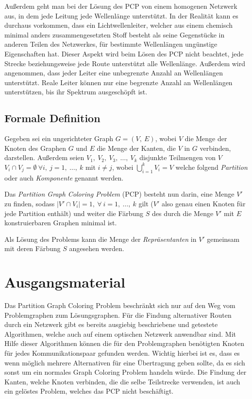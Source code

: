 Außerdem geht man bei der Lösung des PCP von einem homogenen Netzwerk aus, in dem jede Leitung jede Wellenlänge unterstützt. In der Realität kann es durchaus vorkommen, dass ein
Lichtwellenleiter, welcher aus einem chemisch minimal anders zusammengesetzten Stoff besteht als seine Gegenstücke in anderen Teilen des Netzwerkes, für bestimmte Wellenlängen
ungünstige Eigenschaften hat. Dieser Aspekt wird beim Lösen des PCP nicht beachtet, jede Strecke beziehungsweise jede Route unterstützt alle Wellenlänge. Außerdem wird angenommen, 
dass jeder Leiter eine unbegrenzte Anzahl an Wellenlängen unterstützt. Reale Leiter können nur eine begrenzte Anzahl an Wellenlängen unterstützen, bis ihr Spektrum ausgeschöpft ist.

\subsection{Formale Definition}

Gegeben sei ein ungerichteter Graph $G = (V,\ E)$, wobei $V$ die Menge der Knoten des Graphen $G$ und $E$ die Menge der Kanten, die $V$ in $G$ verbinden, darstellen. Außerdem seien $V_1,\ V_2,\ V_3,\ \ldots,\ V_k$ disjunkte Teilmengen von $V$ $V_i \cap V_j = \emptyset \ \forall i,\ j = 1,\ \ldots,\ k$ mit $i \not = j$, wobei $\bigcup_{i = 1}^k V_i = V$ welche folgend \textit{Partition} oder auch \textit{Komponente} genannt werden.

Das \textit{Partition Graph Coloring Problem} (PCP) besteht nun darin, eine Menge $V'$ zu finden, sodass $|V' \cap V_i| = 1,\ \forall\ i = 1,\ \ldots,\ k$ gilt ($V'$ also genau einen Knoten für jede Partition enthält) und weiter die Färbung $S$ des durch die Menge $V'$ mit $E$ konstruierbaren Graphen minimal ist.

Als Lösung des Problems kann die Menge der \textit{Repräsentanten} in $V'$ gemeinsam mit deren Färbung $S$ angesehen werden.

\section{Ausgangsmaterial}
Das Partition Graph Coloring Problem beschränkt sich nur auf den Weg vom Problemgraphen zum Lösungsgraphen. Für die Findung alternativer Routen durch ein Netzwerk gibt es 
bereits ausgiebig beschriebene und getestete Algorithmen, welche auch auf einem optischen Netzwerk anwendbar sind. Mit Hilfe dieser Algorithmen können die für den
Problemgraphen benötigten Knoten für jedes Kommunikationspaar gefunden werden. Wichtig hierbei ist es, dass es wenn möglich mehrere Alternativen für eine Übertragung geben sollte,
da es sich sonst um ein normales Graph Coloring Problem handeln würde. Die Findung der Kanten, welche Knoten verbinden, die die selbe Teilstrecke verwenden, ist auch ein
gelöstes Problem, welches das PCP nicht beschäftigt.

